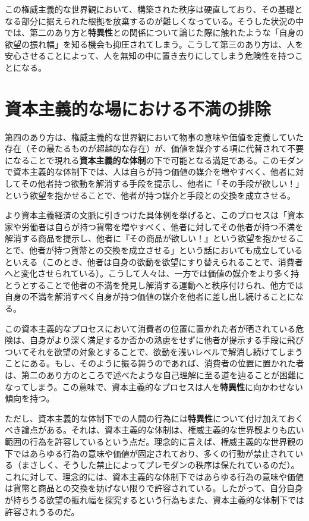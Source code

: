 \documentclass[
]{ltjsarticle}
\begin{document}
この権威主義的な世界観において、構築された秩序は硬直しており、その基礎となる部分に据えられた根拠を放棄するのが難しくなっている。そうした状況の中では、第二のあり方と\textbf{特異性}との関係について論じた際に触れたような「自身の欲望の振れ幅」を知る機会も抑圧されてしまう。こうして第三のあり方は、人を安心させることによって、人を無知の中に置き去りにしてしまう危険性を持つことになる。

\section{資本主義的な場における不満の排除}\label{ux8cc7ux672cux4e3bux7fa9ux7684ux306aux5834ux306bux304aux3051ux308bux4e0dux6e80ux306eux6392ux9664}

第四のあり方は、権威主義的な世界観において物事の意味や価値を定義していた存在（その最たるものが超越的な存在）が、価値を媒介する項に代替されて不要になることで現れる\textbf{資本主義的な体制}の下で可能となる満足である。このモダンで資本主義的な体制下では、人は自らが持つ価値の媒介を増やすべく、他者に対してその他者持つ欲動を解消する手段を提示し、他者に「その手段が欲しい！」という欲望を抱かせることで、他者が持つ媒介と手段との交換を成立させる。

より資本主義経済の文脈に引きつけた具体例を挙げると、このプロセスは「資本家や労働者は自らが持つ貨幣を増やすべく、他者に対してその他者が持つ不満を解消する商品を提示し、他者に『その商品が欲しい！』という欲望を抱かせることで、他者が持つ貨幣との交換を成立させる」という話においても成立しているといえる（このとき、他者は自身の欲動を欲望にすり替えられることで、消費者へと変化させられている）。こうして人々は、一方では価値の媒介をより多く持とうとすることで他者の不満を発見し解消する運動へと秩序付けられ、他方では自身の不満を解消すべく自身が持つ価値の媒介を他者に差し出し続けることになる。

この資本主義的なプロセスにおいて消費者の位置に置かれた者が晒されている危険は、自身がより深く満足するか否かの熟慮をせずに他者が提示する手段に飛びついてそれを欲望の対象とすることで、欲動を浅いレベルで解消し続けてしまうことにある。もし、そのように振る舞うのであれば、消費者の位置に置かれた者は、第二のあり方のところで述べたような自己理解に至る道を辿ることが困難になってしまう。この意味で、資本主義的なプロセスは人を\textbf{特異性}に向かわせない傾向を持つ。

ただし、資本主義的な体制下での人間の行為には\textbf{特異性}について付け加えておくべき論点がある。それは、資本主義的な体制は、権威主義的な世界観よりも広い範囲の行為を許容しているという点だ。理念的に言えば、権威主義的な世界観の下ではあらゆる行為の意味や価値が固定されており、多くの行動が禁止されている（まさしく、そうした禁止によってプレモダンの秩序は保たれているのだ）。これに対して、理念的には、資本主義的な体制下ではあらゆる行為の意味や価値は貨幣と商品との交換を妨げない限りで許容されている。したがって、自分自身が持ちうる欲望の振れ幅を探究するという行為もまた、資本主義的な体制下では許容されうるのだ。
\end{document}
